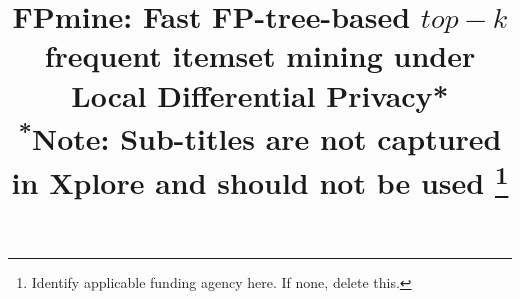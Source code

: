 \documentclass[conference]{IEEEtran}
\begin{document}
\title{FPmine: Fast FP-tree-based $top-k$ frequent itemset mining under Local Differential Privacy*\\
{\footnotesize \textsuperscript{*}Note: Sub-titles are not captured in Xplore and
should not be used}
\thanks{Identify applicable funding agency here. If none, delete this.}
}

\author{
}

\maketitle
\end{document}
